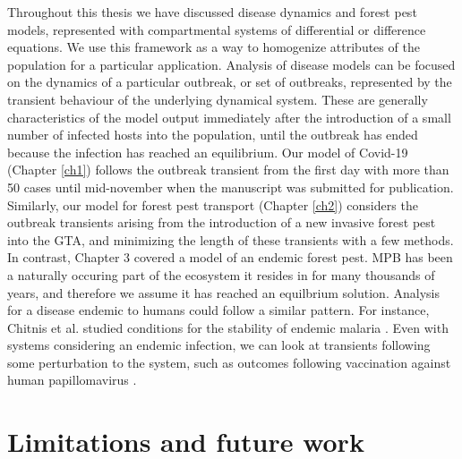Throughout this thesis we have discussed disease dynamics and forest pest models, represented with compartmental systems of differential or difference equations. We use this framework as a way to homogenize attributes of the population for a particular application. Analysis of disease models can be focused on the dynamics of a particular outbreak, or set of outbreaks, represented by the transient behaviour of the underlying dynamical system. These are generally characteristics of the model output immediately after the introduction of a small number of infected hosts into the population, until the outbreak has ended because the infection has reached an equilibrium. Our model of Covid-19 (Chapter \ref{ch1}) follows the outbreak transient from the first day with more than 50 cases until mid-november when the manuscript was submitted for publication. Similarly, our model for forest pest transport (Chapter \ref{ch2}) considers the outbreak transients arising from the introduction of a new invasive forest pest into the GTA, and minimizing the length of these transients with a few methods. In contrast, Chapter 3 covered a model of an endemic forest pest. MPB has been a naturally occuring part of the ecosystem it resides in for many thousands of years, and therefore we assume it has reached an equilbrium solution. Analysis for a disease endemic to humans could follow a similar pattern. For instance, Chitnis et al. studied conditions for the stability of endemic malaria \cite{chitnis2006bifurcation}. Even with systems considering an endemic infection, we can look at transients following some perturbation to the system, such as outcomes following vaccination against human papillomavirus \cite{lee2012mathematical}. 


\section{Limitations and future work}

